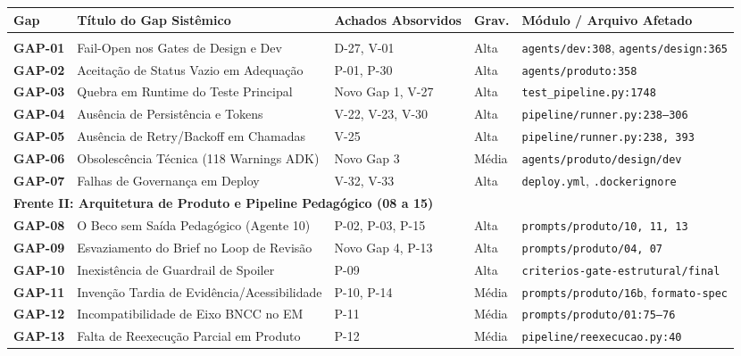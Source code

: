 \documentclass[11pt,a4paper]{article}
\begin{document}
\small
\begin{longtable}{@{}p{1.2cm} p{5.5cm} p{2.2cm} p{1.3cm} p{5.2cm}@{}}
\toprule
\textbf{Gap} & \textbf{Título do Gap Sistêmico} & \textbf{Achados Absorvidos} & \textbf{Grav.} & \textbf{Módulo / Arquivo Afetado} \\
\midrule
\endhead
\bottomrule
\endfoot
\multicolumn{5}{l}{\textbf{\color{NavyBlue}Frente I: Execução, Fail-Safe e Robustez Técnica (01 a 07)}} \\
\midrule
\textbf{GAP-01} & Fail-Open nos Gates de Design e Dev & D-27, V-01 & Alta & \texttt{agents/dev:308}, \texttt{agents/design:365} \\
\textbf{GAP-02} & Aceitação de Status Vazio em Adequação & P-01, P-30 & Alta & \texttt{agents/produto:358} \\
\textbf{GAP-03} & Quebra em Runtime do Teste Principal & Novo Gap 1, V-27 & Alta & \texttt{test\_pipeline.py:1748} \\
\textbf{GAP-04} & Ausência de Persistência e Tokens & V-22, V-23, V-30 & Alta & \texttt{pipeline/runner.py:238--306} \\
\textbf{GAP-05} & Ausência de Retry/Backoff em Chamadas & V-25 & Alta & \texttt{pipeline/runner.py:238, 393} \\
\textbf{GAP-06} & Obsolescência Técnica (118 Warnings ADK) & Novo Gap 3 & Média & \texttt{agents/produto/design/dev} \\
\textbf{GAP-07} & Falhas de Governança em Deploy & V-32, V-33 & Alta & \texttt{deploy.yml}, \texttt{.dockerignore} \\
\midrule
\multicolumn{5}{l}{\textbf{\color{NavyBlue}Frente II: Arquitetura de Produto e Pipeline Pedagógico (08 a 15)}} \\
\midrule
\textbf{GAP-08} & O Beco sem Saída Pedagógico (Agente 10) & P-02, P-03, P-15 & Alta & \texttt{prompts/produto/10, 11, 13} \\
\textbf{GAP-09} & Esvaziamento do Brief no Loop de Revisão & Novo Gap 4, P-13 & Alta & \texttt{prompts/produto/04, 07} \\
\textbf{GAP-10} & Inexistência de Guardrail de Spoiler & P-09 & Alta & \texttt{criterios-gate-estrutural/final} \\
\textbf{GAP-11} & Invenção Tardia de Evidência/Acessibilidade & P-10, P-14 & Média & \texttt{prompts/produto/16b}, \texttt{formato-spec} \\
\textbf{GAP-12} & Incompatibilidade de Eixo BNCC no EM & P-11 & Média & \texttt{prompts/produto/01:75--76} \\
\textbf{GAP-13} & Falta de Reexecução Parcial em Produto & P-12 & Média & \texttt{pipeline/reexecucao.py:40} \\

\end{longtable}
\end{document}
